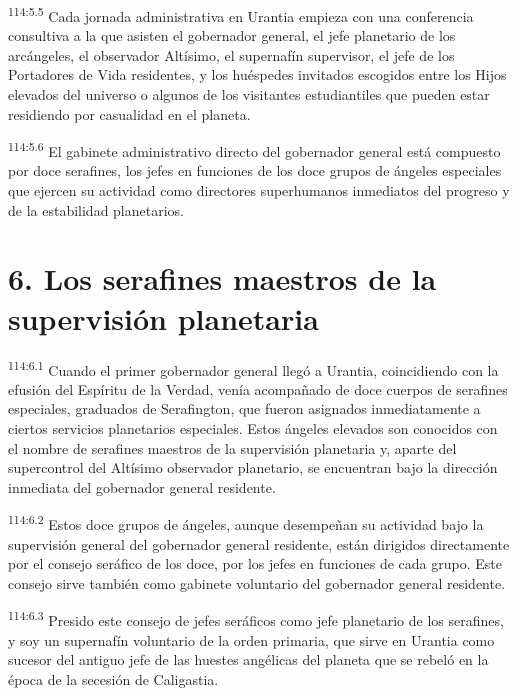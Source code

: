 \par
\textsuperscript{114:5.5} Cada jornada administrativa en Urantia empieza con una conferencia consultiva a la que asisten el gobernador general, el jefe planetario de los arcángeles, el observador Altísimo, el supernafín supervisor, el jefe de los Portadores de Vida residentes, y los huéspedes invitados escogidos entre los Hijos elevados del universo o algunos de los visitantes estudiantiles que pueden estar residiendo por casualidad en el planeta.

\par
\textsuperscript{114:5.6} El gabinete administrativo directo del gobernador general está compuesto por doce serafines, los jefes en funciones de los doce grupos de ángeles especiales que ejercen su actividad como directores superhumanos inmediatos del progreso y de la estabilidad planetarios.

\section*{6. Los serafines maestros de la supervisión planetaria}
\par
\textsuperscript{114:6.1} Cuando el primer gobernador general llegó a Urantia, coincidiendo con la efusión del Espíritu de la Verdad, venía acompañado de doce cuerpos de serafines especiales, graduados de Serafington, que fueron asignados inmediatamente a ciertos servicios planetarios especiales. Estos ángeles elevados son conocidos con el nombre de serafines maestros de la supervisión planetaria y, aparte del supercontrol del Altísimo observador planetario, se encuentran bajo la dirección inmediata del gobernador general residente.

\par
\textsuperscript{114:6.2} Estos doce grupos de ángeles, aunque desempeñan su actividad bajo la supervisión general del gobernador general residente, están dirigidos directamente por el consejo seráfico de los doce, por los jefes en funciones de cada grupo. Este consejo sirve también como gabinete voluntario del gobernador general residente.

\par
\textsuperscript{114:6.3} Presido este consejo de jefes seráficos como jefe planetario de los serafines, y soy un supernafín voluntario de la orden primaria, que sirve en Urantia como sucesor del antiguo jefe de las huestes angélicas del planeta que se rebeló en la época de la secesión de Caligastia.

